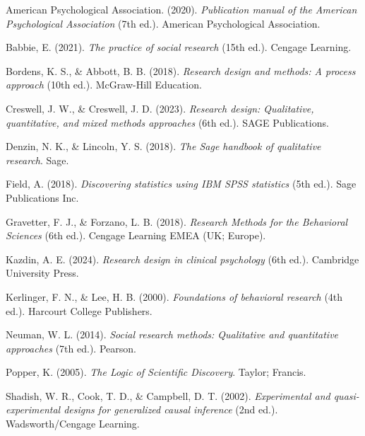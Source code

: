 \documentclass[
  indonesian,
  letterpaper,
  DIV=11,
  numbers=noendperiod]{scrreprt}
\newlength{\cslhangindent}
\newenvironment{CSLReferences}[2] %
 {\begin{list}{}{%
  \setlength{\itemindent}{0pt}
  \setlength{\leftmargin}{0pt}
  \setlength{\parsep}{0pt}
  \ifodd #1
   \setlength{\leftmargin}{\cslhangindent}
   \setlength{\itemindent}{-1\cslhangindent}
  \fi
  \setlength{\itemsep}{#2\baselineskip}}}
 {\end{list}}
\begin{document}
\label{refs--2}
\begin{CSLReferences}{1}{0}
American Psychological Association. (2020). \emph{Publication manual of
the American Psychological Association} (7th ed.). American
Psychological Association.

Babbie, E. (2021). \emph{The practice of social research} (15th ed.).
Cengage Learning.

Bordens, K. S., \& Abbott, B. B. (2018). \emph{Research design and
methods: A process approach} (10th ed.). McGraw-Hill Education.

Creswell, J. W., \& Creswell, J. D. (2023). \emph{Research design:
Qualitative, quantitative, and mixed methods approaches} (6th ed.). SAGE
Publications.

Denzin, N. K., \& Lincoln, Y. S. (2018). \emph{The Sage handbook of
qualitative research}. Sage.

Field, A. (2018). \emph{Discovering statistics using IBM SPSS
statistics} (5th ed.). Sage Publications Inc.

Gravetter, F. J., \& Forzano, L. B. (2018). \emph{Research Methods for
the Behavioral Sciences} (6th ed.). Cengage Learning EMEA (UK; Europe).

Kazdin, A. E. (2024). \emph{Research design in clinical psychology} (6th
ed.). Cambridge University Press.

Kerlinger, F. N., \& Lee, H. B. (2000). \emph{Foundations of behavioral
research} (4th ed.). Harcourt College Publishers.

Neuman, W. L. (2014). \emph{Social research methods: Qualitative and
quantitative approaches} (7th ed.). Pearson.

Popper, K. (2005). \emph{The Logic of Scientific Discovery}. Taylor;
Francis.

Shadish, W. R., Cook, T. D., \& Campbell, D. T. (2002).
\emph{Experimental and quasi-experimental designs for generalized causal
inference} (2nd ed.). Wadsworth/Cengage Learning.

\end{CSLReferences}
\end{document}
